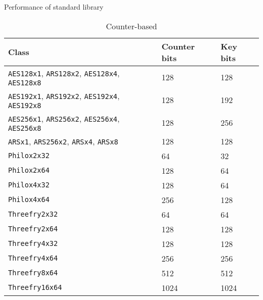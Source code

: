 \begin{table}
  \caption{Performance of standard library \protect\rng}
  \label{tab:Performance of standard library RNG}
\end{table}

\begin{table}
  \tbfigures
  \begin{tabularx}{\textwidth}{lXX}
    \toprule
    Class & Counter bits & Key bits \\
    \midrule
    \verb|AES128x1|, \verb|ARS128x2|, \verb|AES128x4|, \verb|AES128x8|
    & 128 & 128 \\
    \verb|AES192x1|, \verb|ARS192x2|, \verb|AES192x4|, \verb|AES192x8|
    & 128 & 192 \\
    \verb|AES256x1|, \verb|ARS256x2|, \verb|AES256x4|, \verb|AES256x8|
    & 128 & 256 \\
    \verb|ARSx1|, \verb|ARS256x2|, \verb|ARSx4|, \verb|ARSx8| & 128 & 128 \\
    \verb|Philox2x32|    & 64   & 32   \\
    \verb|Philox2x64|    & 128  & 64   \\
    \verb|Philox4x32|    & 128  & 64   \\
    \verb|Philox4x64|    & 256  & 128  \\
    \verb|Threefry2x32|  & 64   & 64   \\
    \verb|Threefry2x64|  & 128  & 128  \\
    \verb|Threefry4x32|  & 128  & 128  \\
    \verb|Threefry4x64|  & 256  & 256  \\
    \verb|Threefry8x64|  & 512  & 512  \\
    \verb|Threefry16x64| & 1024 & 1024 \\
    \bottomrule
  \end{tabularx}
  \caption{Counter-based \protect\rng}
  \label{tab:Counter-based RNG}
\end{table}

